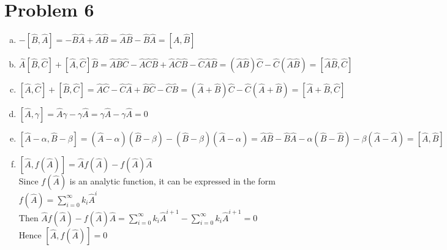 \documentclass[a4paper]{article}
\begin{document}
\section{Problem 6}
\begin{enumerate}[(a)]
    \item $-[\hat{B},\hat{A}]=-\hat{B}\hat{A}+\hat{A}\hat{B}=\hat{A}\hat{B}-\hat{B}\hat{A}=[\hat{A},\hat{B}]$
    \item $\hat{A}[\hat{B},\hat{C}]+[\hat{A},\hat{C}]\hat{B}=\hat{A}\hat{B}\hat{C}-\hat{A}\hat{C}\hat{B}+\hat{A}\hat{C}\hat{B}-\hat{C}\hat{A}\hat{B}=(\hat{A}\hat{B})\hat{C}-\hat{C}(\hat{A}\hat{B})=[\hat{A}\hat{B},\hat{C}]$
    \item $[\hat{A},\hat{C}]+[\hat{B},\hat{C}]=\hat{A}\hat{C}-\hat{C}\hat{A}+\hat{B}\hat{C}-\hat{C}\hat{B}=(\hat{A}+\hat{B})\hat{C}-\hat{C}(\hat{A}+\hat{B})=[\hat{A}+\hat{B},\hat{C}]$
    \item $[\hat{A},\gamma]=\hat{A}\gamma-\gamma\hat{A}=\gamma\hat{A}-\gamma\hat{A}=0$
    \item $[\hat{A}-\alpha,\hat{B}-\beta]=(\hat{A}-\alpha)(\hat{B}-\beta)-(\hat{B}-\beta)(\hat{A}-\alpha)=\hat{A}\hat{B}-\hat{B}\hat{A}-\alpha(\hat{B}-\hat{B})-\beta(\hat{A}-\hat{A})=[\hat{A},\hat{B}]$
    \item $[\hat{A},f(\hat{A})]=\hat{A}f(\hat{A})-f(\hat{A})\hat{A}$
    \\Since $f(\hat{A})$ is an analytic function, it can be expressed in the form $f(\hat{A})=\sum_{i=0}^{\infty}k_i \hat{A}^i$
    \\Then $\hat{A}f(\hat{A})-f(\hat{A})\hat{A}=\sum_{i=0}^{\infty}k_i \hat{A}^{i+1}-\sum_{i=0}^{\infty}k_i \hat{A}^{i+1}=0$
    \\Hence $[\hat{A},f(\hat{A})]=0$
\end{enumerate}
\end{document}
